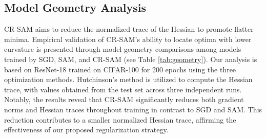\documentclass[letterpaper]{article} %
\theoremstyle{plain}
\theoremstyle{definition}
\begin{document}
\begin{table}[h]
    \centering
    \small
    \caption{Results on ImageNet-1k/-C/-R, the base optimizer for ResNets and ViTs
are SGD+M and AdamW, respectively.}
    \vspace{-0.1cm}
    \label{tab:imagenet}
\end{table}

\subsection{Model Geometry Analysis}
\label{subsec:eigenvalue}
CR-SAM aims to reduce the normalized trace of the Hessian to promote flatter minima. Empirical validation of CR-SAM's ability to locate optima with lower curvature is presented through model geometry comparisons among models trained by SGD, SAM, and CR-SAM (see Table \ref{tab:geometry}). Our analysis is based on ResNet-18 trained on CIFAR-100 for 200 epochs using the three optimization methods. Hutchinson’s method \cite{avron2011randomized, yao2020pyhessian} is utilized to compute the Hessian trace, with values obtained from the test set across three independent runs. Notably, the results reveal that CR-SAM significantly reduces both gradient norms and Hessian traces throughout training in contrast to SGD and SAM. This reduction contributes to a smaller normalized Hessian trace, affirming the effectiveness of our proposed regularization strategy.
\end{document}
